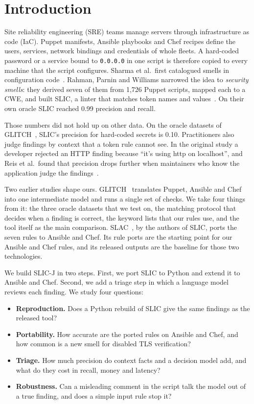 \documentclass[conference]{IEEEtran}
\newcommand{\slicj}{SLIC-J}
\begin{document}
\section{Introduction}
Site reliability engineering (SRE) teams manage servers through infrastructure as code (IaC). Puppet manifests,
Ansible playbooks and Chef recipes define the users, services, network bindings and credentials of whole fleets. A
hard-coded password or a service bound to \texttt{0.0.0.0} in one script is therefore copied to every machine that the
script configures. Sharma et al.\ first catalogued smells in configuration code~\cite{sharma2016config}. Rahman,
Parnin and Williams narrowed the idea to \emph{security smells}: they derived seven of them from 1{,}726 Puppet
scripts, mapped each to a CWE, and built SLIC, a linter that matches token names and values~\cite{rahman2019seven}.
On their own oracle SLIC reached 0.99 precision and recall.

Those numbers did not hold up on other data. On the oracle datasets of GLITCH~\cite{saavedra2022glitch}, SLIC's
precision for hard-coded secrets is 0.10. Practitioners also judge findings by context that a token rule cannot see.
In the original study a developer rejected an HTTP finding because ``it's using http on localhost'', and Reis et
al.\ found that precision drops further when maintainers who know the application judge the
findings~\cite{reis2022feedback}.

Two earlier studies shape ours. GLITCH~\cite{saavedra2022glitch,saavedra2023glitch} translates Puppet, Ansible and
Chef into one intermediate model and runs a single set of checks. We take four things from it: the three oracle
datasets that we test on, the matching protocol that decides when a finding is correct, the keyword lists that our
rules use, and the tool itself as the main comparison. SLAC~\cite{rahman2021slac}, by the authors of SLIC, ports the
seven rules to Ansible and Chef. Its rule ports are the starting point for our Ansible and Chef rules, and its
released outputs are the baseline for those two technologies.

We build \slicj{} in two steps. First, we port SLIC to Python and extend it to Ansible and Chef. Second, we add a
triage step in which a language model reviews each finding. We study four questions:
\begin{itemize}
\item \textbf{Reproduction.} Does a Python rebuild of SLIC give the same findings as the released tool?
\item \textbf{Portability.} How accurate are the ported rules on Ansible and Chef, and how common is a new smell for
disabled TLS verification?
\item \textbf{Triage.} How much precision do context facts and a decision model add, and what do they cost in recall,
money and latency?
\item \textbf{Robustness.} Can a misleading comment in the script talk the model out of a true finding, and does a
simple input rule stop it?
\end{itemize}
\end{document}
